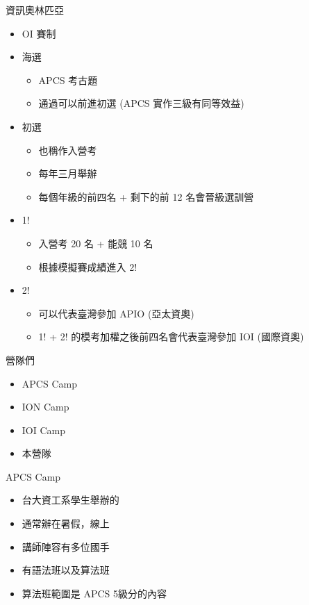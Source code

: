 \documentclass[aspectratio=169]{beamer}
\begin{document}
	\begin{frame}{資訊奧林匹亞}
		\begin{itemize}
			\item<1-> OI 賽制
			\item<2-> 海選
				\begin{itemize}
					\item APCS 考古題
					\item 通過可以前進初選 (APCS 實作三級有同等效益)
				\end{itemize}
			\item<3-> 初選
				\begin{itemize}
					\item 也稱作入營考
					\item 每年三月舉辦
					\item 每個年級的前四名 + 剩下的前 12 名會晉級選訓營
				\end{itemize}
			\item<4-> 1!
				\begin{itemize}
					\item 入營考 20 名 + 能競 10 名
					\item 根據模擬賽成績進入 2!
				\end{itemize}
			\item<5-> 2!
				\begin{itemize}
					\item 可以代表臺灣參加 APIO (亞太資奧)
					\item 1! + 2! 的模考加權之後前四名會代表臺灣參加 IOI (國際資奧)
				\end{itemize}
			
		\end{itemize}
	\end{frame}

	\begin{frame}{營隊們}
		\begin{itemize}
			\item APCS Camp
			\item ION Camp
			\item IOI Camp
			\item 本營隊
		\end{itemize}
	\end{frame}

	\begin{frame}{APCS Camp}
		\begin{itemize}
			\item 台大資工系學生舉辦的
			\item 通常辦在暑假，線上
			\item 講師陣容有多位國手
			\item 有語法班以及算法班
			\item 算法班範圍是 APCS 5級分的內容
		\end{itemize}
	\end{frame}
\end{document}

